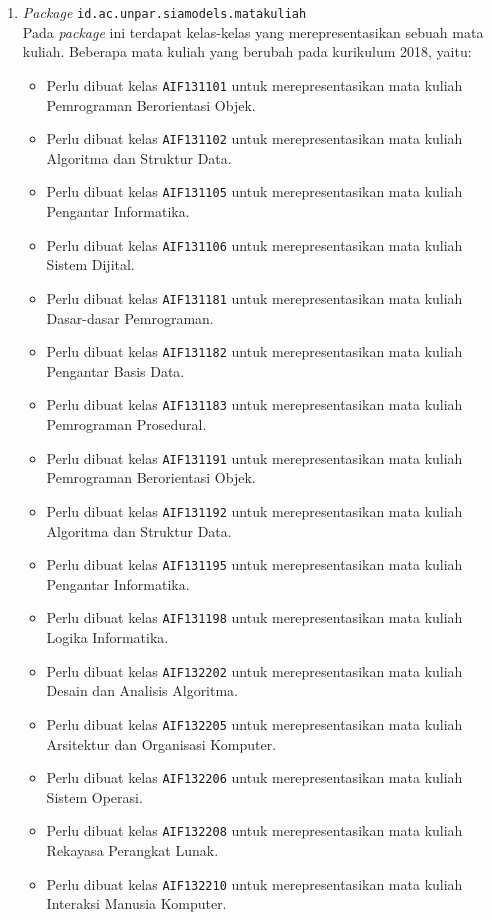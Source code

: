 \begin{enumerate}
	\item \textit{Package} \texttt{id.ac.unpar.siamodels.matakuliah} \\
	Pada \textit{package} ini terdapat kelas-kelas yang merepresentasikan sebuah mata kuliah. Beberapa mata kuliah yang berubah pada kurikulum 2018, yaitu:
	\begin{itemize}
		\item Perlu dibuat kelas \texttt{AIF131101} untuk merepresentasikan mata kuliah Pemrograman Berorientasi Objek.
		\item Perlu dibuat kelas \texttt{AIF131102} untuk merepresentasikan mata kuliah Algoritma dan Struktur Data.
		\item Perlu dibuat kelas \texttt{AIF131105} untuk merepresentasikan mata kuliah Pengantar Informatika.
		\item Perlu dibuat kelas \texttt{AIF131106} untuk merepresentasikan mata kuliah Sistem Dijital.
		\item Perlu dibuat kelas \texttt{AIF131181} untuk merepresentasikan mata kuliah Dasar-dasar Pemrograman.
		\item Perlu dibuat kelas \texttt{AIF131182} untuk merepresentasikan mata kuliah Pengantar Basis Data.
		\item Perlu dibuat kelas \texttt{AIF131183} untuk merepresentasikan mata kuliah Pemrograman Prosedural.
		\item Perlu dibuat kelas \texttt{AIF131191} untuk merepresentasikan mata kuliah Pemrograman Berorientasi Objek.
		\item Perlu dibuat kelas \texttt{AIF131192} untuk merepresentasikan mata kuliah Algoritma dan Struktur Data.
		\item Perlu dibuat kelas \texttt{AIF131195} untuk merepresentasikan mata kuliah Pengantar Informatika.
		\item Perlu dibuat kelas \texttt{AIF131198} untuk merepresentasikan mata kuliah Logika Informatika.
		\item Perlu dibuat kelas \texttt{AIF132202} untuk merepresentasikan mata kuliah Desain dan Analisis Algoritma.
		\item Perlu dibuat kelas \texttt{AIF132205} untuk merepresentasikan mata kuliah Arsitektur dan Organisasi Komputer.
		\item Perlu dibuat kelas \texttt{AIF132206} untuk merepresentasikan mata kuliah Sistem Operasi.
		\item Perlu dibuat kelas \texttt{AIF132208} untuk merepresentasikan mata kuliah Rekayasa Perangkat Lunak.
		\item Perlu dibuat kelas \texttt{AIF132210} untuk merepresentasikan mata kuliah Interaksi Manusia Komputer.

\end{itemize}
\end{enumerate}
